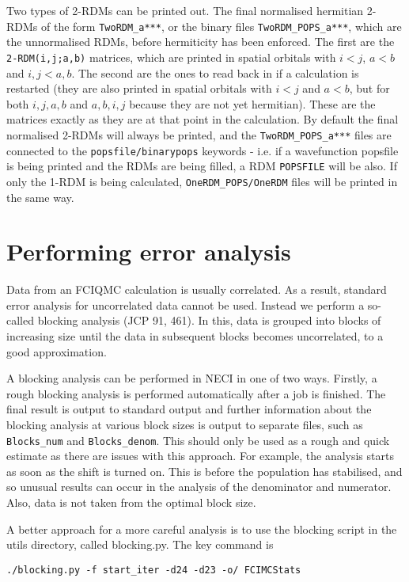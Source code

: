 \documentclass[a4paper,notitlepage,dvipsnames]{scrreprt}
\let\code\lstinline
\begin{document}
	Two types of 2-RDMs can be printed out.  The final normalised hermitian 2-RDMs of the form \code{TwoRDM_a***}, or the
	binary files \code{TwoRDM_POPS_a***}, which are the unnormalised RDMs, before hermiticity has been enforced.  The
	first are the \code{2-RDM(i,j;a,b)} matrices, which are printed in
    spatial orbitals with $i<j$, $a<b$ and $i,j<a,b$.  The second are the ones to read back in if a calculation
    is restarted (they are also printed in spatial orbitals with $i<j$ and $a<b$, but for both $i,j,a,b$ and $a,b,i,j$
    because they are not yet hermitian).  These are the matrices exactly as they are at that point in the calculation.
	By default the final normalised 2-RDMs will always be printed, and the \code{TwoRDM_POPS_a***} files are connected to the
    \code{popsfile/binarypops} keywords - i.e. if a wavefunction popsfile is being printed and the RDMs are being filled,
	a RDM \code{POPSFILE} will be also.
	If only the 1-RDM is being calculated, \code{OneRDM_POPS/OneRDM} files will be printed in the same way.

\section{Performing error analysis}
    Data from an FCIQMC calculation is usually correlated. As a result,
    standard error analysis for uncorrelated data cannot be used. Instead we
    perform a so-called blocking analysis (JCP 91, 461). In this, data is
    grouped into blocks of increasing size until the data in subsequent blocks
    becomes uncorrelated, to a good approximation.

    A blocking analysis can be performed in NECI in one of two ways. Firstly,
    a rough blocking analysis is performed automatically after a job is finished.
    The final result is output to standard output and further information about
    the blocking analysis at various block sizes is output to separate files,
	such as \code{Blocks_num} and \code{Blocks_denom}. This should only be
	used as a rough
    and quick estimate as there are issues with this approach. For example, the
    analysis starts as soon as the shift is turned on. This is before the
    population has stabilised, and so unusual results can occur in the analysis
    of the denominator and numerator. Also, data is not taken from the optimal
    block size.

    A better approach for a more careful analysis is to use the blocking script
    in the utils directory, called blocking.py. The key command is
	\begin{lstlisting}[gobble=4]
		./blocking.py -f start_iter -d24 -d23 -o/ FCIMCStats
    \end{lstlisting}
\end{document}
